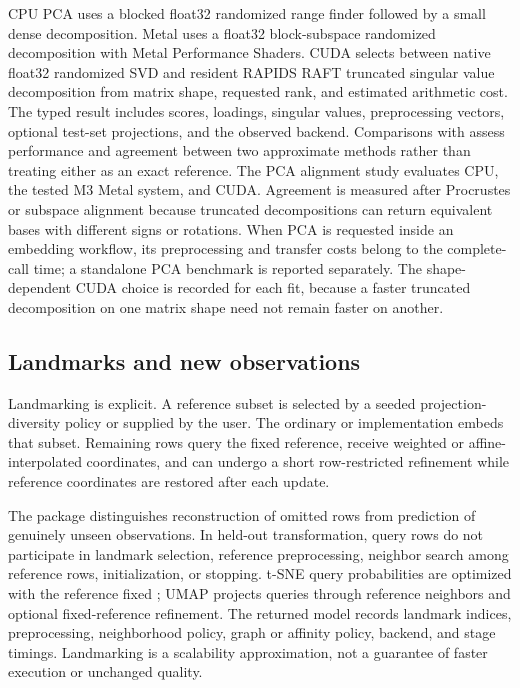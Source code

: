 \documentclass[article]{jss}
\begin{document}
CPU PCA uses a blocked float32 randomized range finder followed by a small
dense decomposition. Metal uses a float32 block-subspace randomized
decomposition with Metal Performance Shaders. CUDA selects between native
float32 randomized SVD and resident RAPIDS RAFT truncated singular value
decomposition from matrix shape, requested rank, and estimated arithmetic
cost. The typed result includes scores,
loadings, singular values, preprocessing vectors, optional test-set
projections, and the observed backend. Comparisons with 
\citep{irlba2026} assess performance and agreement between two approximate
methods rather than treating either as an exact reference.
The PCA alignment study evaluates CPU, the tested M3 Metal system, and CUDA.
Agreement is measured after Procrustes or subspace alignment because truncated
decompositions can return equivalent bases with different signs or rotations.
When PCA is requested inside an embedding workflow, its preprocessing and
transfer costs belong to the complete-call time; a standalone PCA benchmark
is reported separately. The shape-dependent CUDA choice is recorded for each
fit, because a faster truncated decomposition on one matrix shape need not
remain faster on another.

\subsection{Landmarks and new observations}

Landmarking is explicit. A reference subset is selected by a seeded
projection-diversity policy or supplied by the user. The ordinary
 or  implementation embeds
that subset. Remaining
rows query the fixed reference, receive weighted or affine-interpolated
coordinates, and can undergo a short row-restricted refinement while reference
coordinates are restored after each update.

The package distinguishes reconstruction of omitted rows from prediction of
genuinely unseen observations. In held-out transformation, query rows do not
participate in landmark selection, reference preprocessing, neighbor search
among reference rows, initialization, or stopping. t-SNE query probabilities
are optimized with the reference fixed \citep{policar2021}; UMAP projects
queries through reference neighbors and optional fixed-reference refinement.
The returned model records landmark indices, preprocessing, neighborhood
policy, graph or affinity policy, backend, and stage timings. Landmarking is a
scalability approximation, not a guarantee of faster execution or unchanged
quality.
\end{document}
